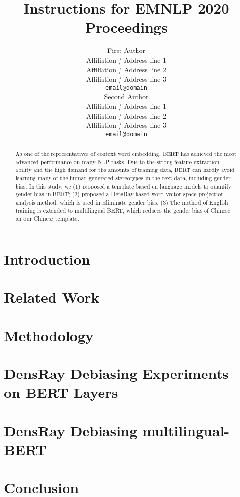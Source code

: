 \documentclass[11pt,a4paper]{article}
\title{Instructions for EMNLP 2020 Proceedings}
\author{First Author \\
  Affiliation / Address line 1 \\
  Affiliation / Address line 2 \\
  Affiliation / Address line 3 \\
  \texttt{email@domain} \\\And
  Second Author \\
  Affiliation / Address line 1 \\
  Affiliation / Address line 2 \\
  Affiliation / Address line 3 \\
  \texttt{email@domain} \\}
\date{}
\begin{document}
\maketitle
\begin{abstract}
As one of the representatives of context word embedding, BERT has achieved the most advanced performance on many NLP tasks. Due to the strong feature extraction ability and the high demand for the amounts of training data, BERT can hardly avoid learning many of the human-generated stereotypes in the text data, including gender bias. In this study, we (1) proposed a template based on language models to quantify gender bias in BERT; (2) proposed a DensRay-based word vector space projection analysis method, which is used in Eliminate gender bias. (3) The method of English training is extended to multilingual BERT, which reduces the gender bias of Chinese on our Chinese template.
\end{abstract}

\section{Introduction}


\section{Related Work}


\section{Methodology}


\section{DensRay Debiasing Experiments on BERT Layers}


\section{DensRay Debiasing multilingual-BERT}


\section{Conclusion}



%




\end{document}
